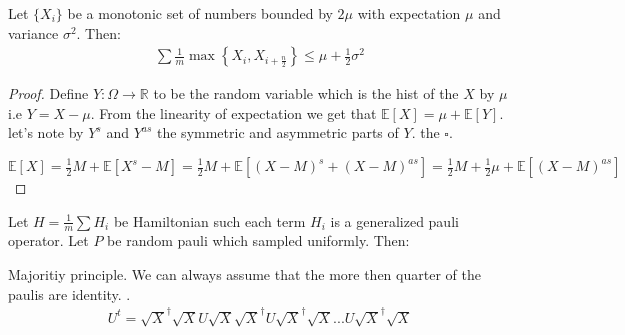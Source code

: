\documentclass{article}
\begin{document}
      \begin{lemma} Let \(\{X_{i}\}\) be a monotonic set of numbers bounded by \(2\mu\) with expectation \( \mu \) and variance \( \sigma^2 \). Then:
	\begin{equation*}
	  \begin{split}
	    \sum{ \frac{1}{m}\max{ \left\{ X_{i}, X_{i+ \frac{n}{2}} \right\} } } \le \mu + \frac{1}{2}\sigma^2  
	  \end{split}
	\end{equation*}
      \end{lemma}
      \begin{proof} 
	Define \(Y : \Omega \rightarrow \mathbb{R} \) to be the random  variable which is the hist of the \(X\) by \(\mu\) i.e \(Y = X -\mu\). From the linearity of expectation we get that \(\mathbb{E}[X] = \mu + \mathbb{E}[Y]\). let's note by \(Y^{s}\) and \(Y^{as}\) the symmetric and asymmetric parts of \(Y\). the \(\square\). 

	\( \mathbb{E}[X] = \frac{1}{2}M + \mathbb{E}[X^{s} - M] = \frac{1}{2}M + \mathbb{E}[(X-M)^{s} + (X-M)^{as}] = \frac{1}{2}M + \frac{1}{2}\mu + \mathbb{E}[(X-M)^{as}] \) 
      \end{proof}
      \begin{lemma} Let \( H = \frac{1}{m}\sum{H_{i}}\) be Hamiltonian such each term \(H_{i}\) is a generalized pauli operator. Let \(P\) be random pauli which sampled uniformly. Then:   
      \end{lemma}

      \begin{lemma} Majoritiy principle. We can always assume that the more then quarter of the paulis are identity.  .
	\begin{equation*}
	  \begin{split}
	    U^{t} = \sqrt{X}^\dagger\sqrt{X}U\sqrt{X}\sqrt{X}^\dagger U \sqrt{X}^\dagger\sqrt{X} ... U \sqrt{X}^\dagger\sqrt{X}
	  \end{split}
	\end{equation*}
      \end{lemma}
       

 \printbibliography 
  
\end{document}
